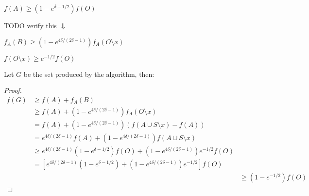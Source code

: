 \begin{observation}
$f(A) \geq (1 - e^{\delta - 1/2})f(O)$
\end{observation}

TODO verify this $\Downarrow$
\begin{observation}
$f_A(B) \geq (1 - e^{4\delta / (2\delta - 1)})f_A(O \setminus x)$
\end{observation}

\begin{observation}
$f(O \setminus x) \geq e^{-1/2}f(O)$
\end{observation}

Let $G$ be the set produced by the algorithm, then:
\begin{proof}
\def\arraystretch{1.5}
$$
\begin{array}{lll}
% 
f(G) & \geq f(A) + f_A(B)
\\& \geq f(A) + (1 - e^{4\delta / (2\delta - 1)})f_A(O \setminus x)
\\& = f(A) + (1 - e^{4\delta / (2\delta - 1)})(f(A \cup S \setminus x) - f(A))
\\& = e^{4\delta / (2\delta - 1)}f(A) 
	+ (1 - e^{4\delta / (2\delta - 1)})f(A \cup S \setminus x)
\\& \geq e^{4\delta / (2\delta - 1)}(1 - e^{\delta - 1/2})f(O)
	+ (1 - e^{4\delta / (2\delta - 1)})e^{-1/2}f(O)
\\& = [
		e^{4\delta / (2\delta - 1)}(1 - e^{\delta - 1/2}) + (1 - e^{4\delta / (2\delta - 1)})e^{-1/2}
		]f(O)
\\&& \geq (1-e^{-1/2})f(O)
% 
\end{array}
$$
\end{proof}
